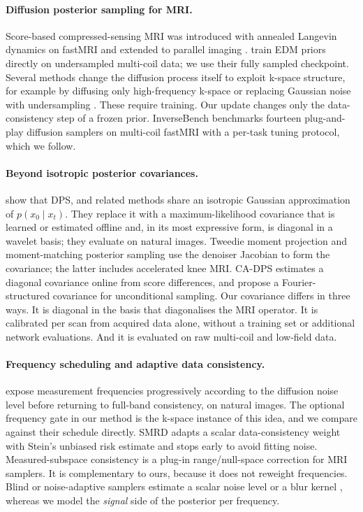 \paragraph{Diffusion posterior sampling for MRI.}
Score-based compressed-sensing MRI was introduced with annealed Langevin
dynamics on fastMRI \citep{jalal2021robust} and extended to parallel imaging
\citep{chung2022scoremri}. \citet{aali2025ambient} train EDM priors
\citep{karras2022edm} directly on undersampled multi-coil data; we use their
fully sampled checkpoint. Several methods change the diffusion process itself
to exploit k-space structure, for example by diffusing only high-frequency
k-space \citep{cao2024hfssde} or replacing Gaussian noise with undersampling
\citep{huang2023cdiffmr}. These require training. Our update changes only the
data-consistency step of a frozen prior. InverseBench
\citep{zheng2025inversebench} benchmarks fourteen plug-and-play diffusion
samplers on multi-coil fastMRI with a per-task tuning protocol, which we
follow.

\paragraph{Beyond isotropic posterior covariances.}
\citet{peng2024optimal} show that DPS, \pigdm{} and related methods share an
isotropic Gaussian approximation of $p(x_0\mid x_t)$. They replace it with a
maximum-likelihood covariance that is learned or estimated offline and, in its
most expressive form, is diagonal in a wavelet basis; they evaluate on natural
images. Tweedie moment projection \citep{boys2024tmpd} and moment-matching
posterior sampling \citep{rozet2024mmps} use the denoiser Jacobian to form the
covariance; the latter includes accelerated knee MRI. CA-DPS
\citep{hamidi2024cadps} estimates a diagonal covariance online from score
differences, and \citet{schioppa2026covariance} propose a Fourier-structured
covariance for unconditional sampling. Our covariance differs in three ways. It
is diagonal in the basis that diagonalises the MRI operator. It is calibrated
per scan from acquired data alone, without a training set or additional network
evaluations. And it is evaluated on raw multi-coil and low-field data.

\paragraph{Frequency scheduling and adaptive data consistency.}
\citet{tian2026frequency} expose measurement frequencies progressively
according to the diffusion noise level before returning to full-band
consistency, on natural images. The optional frequency gate in our method is
the k-space instance of this idea, and we compare against their schedule
directly. SMRD \citep{ozturkler2023smrd} adapts a scalar data-consistency
weight with Stein's unbiased risk estimate and stops early to avoid fitting
noise. Measured-subspace consistency \citep{lee2026msc} is a plug-in
range/null-space correction for MRI samplers. It is complementary to ours,
because it does not reweight frequencies. Blind or noise-adaptive samplers
estimate a scalar noise level or a blur kernel
\citep{laroche2024fastdiffem,xia2026nanhmc}, whereas we model the
\emph{signal} side of the posterior per frequency.

